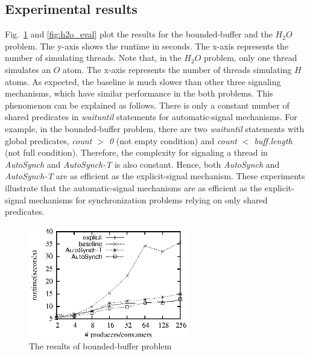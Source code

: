 \documentclass{sigplanconf}
\begin{document}
\subsection{Experimental results}


Fig.~\ref{fig:pc_eval} and \ref{fig:h2o_eval} plot the results for the
bounded-buffer and the $H_2O$ problem. The y-axis shows
the runtime in seconds. The x-axis represents the number of simulating threads. 
Note that, in the $H_2O$ problem, only one thread simulates an $O$ atom. The
x-axis represents the number of threads simulating $H$ atoms. 
As expected, 
the baseline is much slower than other three signaling mechanisms, which have
similar performance in the both problems. This 
phenomenon can be explained as follows. There is only a constant number of
shared predicates in {\em waituntil} statements for automatic-signal mechanisms.  
For example, in the bounded-buffer problem, there are two {\em waituntil} statements 
with global predicates, {\em count $>$ 0} (not empty condition) and {\em count
$<$ buff.length} (not full condition). Therefore, the 
complexity for signaling a thread in {\em AutoSynch} and {\em AutoSynch-T} is 
also constant. Hence, both {\em AutoSynch} and {\em AutoSynch-T} are as 
efficient as the explicit-signal mechanism. 
These experiments illustrate that the automatic-signal mechanisms
are as efficient as the explicit-signal mechanisms for synchronization 
problems relying on only shared predicates. 

\begin{figure}[ht!]
  \centering
  \includegraphics[width=70mm]{fig/pc.eps}
  \caption{The results of bounded-buffer problem}
  \label{fig:pc_eval}
\end{figure}
\end{document}
